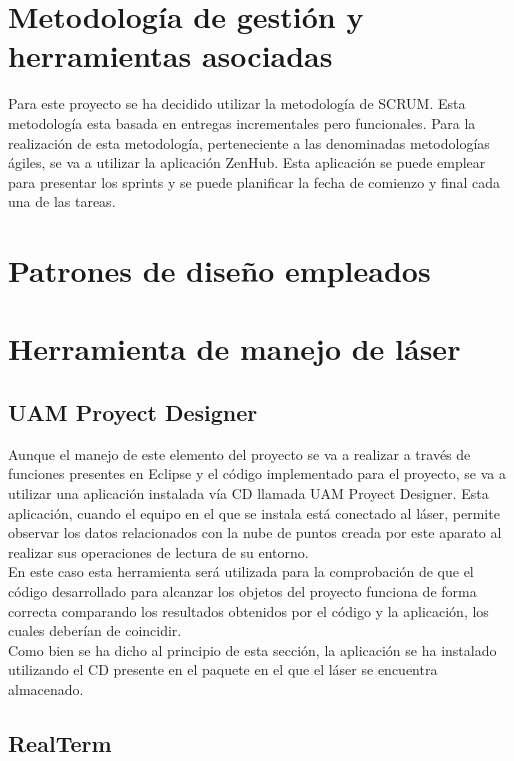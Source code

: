\section{Metodología de gestión y herramientas asociadas}

Para este proyecto se ha decidido utilizar la metodología de SCRUM. Esta metodología esta basada en entregas incrementales pero funcionales. Para la realización de esta metodología, perteneciente a las denominadas metodologías ágiles, se va a utilizar la aplicación ZenHub. Esta aplicación se puede emplear para presentar los sprints y se puede planificar la fecha de comienzo y final cada una de las tareas.

\section{Patrones de diseño empleados}



\section{Herramienta de manejo de láser}

\subsection{ UAM Proyect Designer}
Aunque el manejo de este elemento del proyecto se va a realizar a través de funciones presentes en Eclipse y el código implementado para el proyecto, se va a utilizar una aplicación instalada vía CD llamada UAM Proyect Designer. Esta aplicación, cuando el equipo en el que se instala está conectado al láser, permite observar los datos relacionados con la nube de puntos creada por este aparato al realizar sus operaciones de lectura de su entorno.\\
En este caso esta herramienta será utilizada para la comprobación de que el código desarrollado para alcanzar los objetos del proyecto funciona de forma correcta comparando los resultados obtenidos por el código y la aplicación, los cuales deberían de coincidir.\\
Como bien se ha dicho al principio de esta sección, la aplicación se ha instalado utilizando el CD presente en el paquete en el que el láser se encuentra almacenado. 

\subsection{RealTerm}

